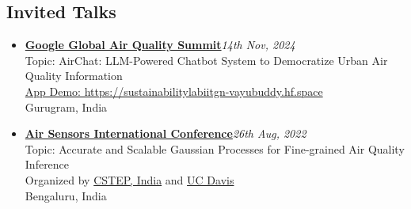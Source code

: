 \documentclass[letter,10pt]{article}
\begin{document}

\subsection*{\sc \textbf{Invited Talks}\hspace{5pt}\noindent\hrulefill}

\begin{itemize}
    \item[] \href{https://earthoutreachonair.withgoogle.com/events/aq-summit-2024#}{\textbf{Google Global Air Quality Summit}}\hfill \textit{14th Nov, 2024}\\Topic: AirChat: LLM-Powered Chatbot System to Democratize Urban Air Quality Information\\\href{https://sustainabilitylabiitgn-vayubuddy.hf.space}{App Demo: https://sustainabilitylabiitgn-vayubuddy.hf.space}\\Gurugram, India\\
    
    \item[] \href{https://asic.aqrc.ucdavis.edu/}{\textbf{Air Sensors International Conference}}\hfill \textit{26th Aug, 2022}\\
        Topic: Accurate and Scalable Gaussian Processes for Fine-grained Air Quality Inference\\
        Organized by \href{https://www.cstep.in/}{CSTEP, India} and \href{https://www.ucdavis.edu/}{UC Davis}\\
	Bengaluru, India
\end{itemize}



\end{document}
